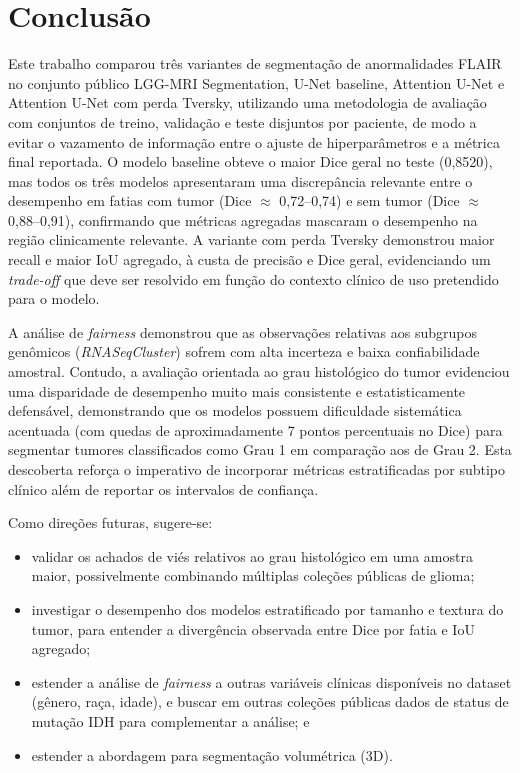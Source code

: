 \documentclass[conference]{IEEEtran}
\begin{document}
\section{Conclusão}
Este trabalho comparou três variantes de segmentação de anormalidades FLAIR no conjunto público LGG-MRI Segmentation, U-Net baseline, Attention U-Net e Attention U-Net com perda Tversky, utilizando uma metodologia de avaliação com conjuntos de treino, validação e teste disjuntos por paciente, de modo a evitar o vazamento de informação entre o ajuste de hiperparâmetros e a métrica final reportada. O modelo baseline obteve o maior Dice geral no teste (0,8520), mas todos os três modelos apresentaram uma discrepância relevante entre o desempenho em fatias com tumor (Dice $\approx$ 0,72--0,74) e sem tumor (Dice $\approx$ 0,88--0,91), confirmando que métricas agregadas mascaram o desempenho na região clinicamente relevante. A variante com perda Tversky demonstrou maior recall e maior IoU agregado, à custa de precisão e Dice geral, evidenciando um \textit{trade-off} que deve ser resolvido em função do contexto clínico de uso pretendido para o modelo.

A análise de \textit{fairness} demonstrou que as observações relativas aos subgrupos genômicos (\textit{RNASeqCluster}) sofrem com alta incerteza e baixa confiabilidade amostral. Contudo, a avaliação orientada ao grau histológico do tumor evidenciou uma disparidade de desempenho muito mais consistente e estatisticamente defensável, demonstrando que os modelos possuem dificuldade sistemática acentuada (com quedas de aproximadamente 7 pontos percentuais no Dice) para segmentar tumores classificados como Grau 1 em comparação aos de Grau 2. Esta descoberta reforça o imperativo de incorporar métricas estratificadas por subtipo clínico além de reportar os intervalos de confiança.

Como direções futuras, sugere-se:
\begin{itemize}
    \item validar os achados de viés relativos ao grau histológico em uma amostra maior, possivelmente combinando múltiplas coleções públicas de glioma;
    \item investigar o desempenho dos modelos estratificado por tamanho e textura do tumor, para entender a divergência observada entre Dice por fatia e IoU agregado;
    \item estender a análise de \textit{fairness} a outras variáveis clínicas disponíveis no dataset (gênero, raça, idade), e buscar em outras coleções públicas dados de status de mutação IDH para complementar a análise; e
    \item estender a abordagem para segmentação volumétrica (3D).
\end{itemize}
\end{document}
